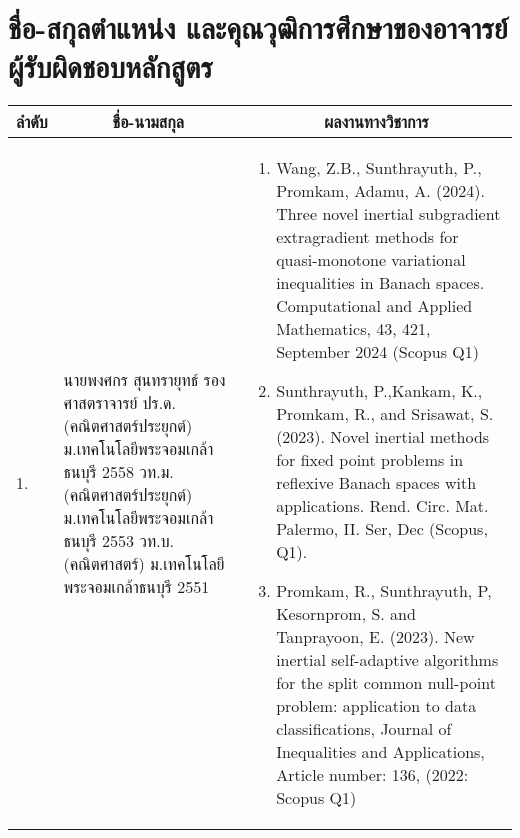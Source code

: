 \section{ชื่อ-สกุลตำแหน่ง และคุณวุฒิการศึกษาของอาจารย์ผู้รับผิดชอบหลักสูตร}
{\small
\begin{center}
\begin{longtable}{|p{}|p{}|p{}|}
	\hline
	\multicolumn{1}{|c|}{\textbf{ลำดับ}} &
	\multicolumn{1}{c|}{\textbf{ชื่อ-นามสกุล}} &
	\multicolumn{1}{c|}{\textbf{ผลงานทางวิชาการ}}\\
	\hline
\endhead	



1. &
นายพงศกร สุนทรายุทธ์ \newline 
รองศาสตราจารย์	\newline
ปร.ด.(คณิตศาสตร์ประยุกต์) \newline ม.เทคโนโลยีพระจอมเกล้าธนบุรี 2558 \newline
วท.ม.(คณิตศาสตร์ประยุกต์) \newline ม.เทคโนโลยีพระจอมเกล้าธนบุรี 2553  \newline
วท.บ.(คณิตศาสตร์) \newline ม.เทคโนโลยีพระจอมเกล้าธนบุรี 2551
&
\begin{enumerate}[series=tar]
	\item Wang, Z.B., Sunthrayuth, P., Promkam, Adamu, A. (2024). Three novel inertial subgradient extragradient methods for quasi-monotone variational inequalities in Banach spaces. Computational and Applied Mathematics, 43, 421, September 2024 (Scopus Q1) 
	\item Sunthrayuth, P.,Kankam, K., Promkam, R., and Srisawat, S. (2023). Novel inertial methods for fixed point problems in reflexive Banach spaces with applications. Rend. Circ. Mat. Palermo, II. Ser, Dec (Scopus, Q1). 
	\item Promkam, R., Sunthrayuth, P, Kesornprom, S. and Tanprayoon, E. (2023). New inertial self-adaptive algorithms for the split common null-point problem: application to data classifications, Journal of Inequalities and Applications, Article number: 136, (2022: Scopus Q1)

\end{enumerate}
\end{longtable}
\end{center}}
